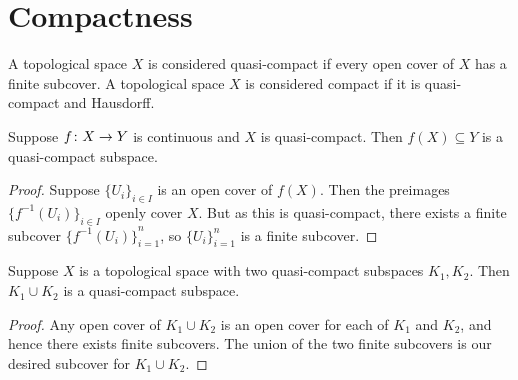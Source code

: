 \section{Compactness}

\begin{definition}
    A topological space \(X\) is considered quasi-compact
    if every open cover of \(X\) has a finite subcover.
    A topological space \(X\) is considered compact
    if it is quasi-compact and Hausdorff.
\end{definition}
\begin{proposition}\label{prop:continuous-image-compact}
    Suppose \(f\colon X\to Y\) is continuous and \(X\) is quasi-compact.
    Then \(f(X) \subseteq Y\) is a quasi-compact subspace.
\end{proposition}
\begin{proof}
    Suppose \({\{U_i\}}_{i \in I}\) is an open cover of \(f(X)\).
    Then the preimages \({\{f^{-1}(U_i)\}}_{i \in I}\) openly cover \(X\).
    But as this is quasi-compact, there exists a finite subcover \({\{f^{-1}(U_i)\}}_{i=1}^n\),
    so \({\{U_i\}}_{i=1}^n\) is a finite subcover.
\end{proof}
\begin{proposition}
    Suppose \(X\) is a topological space with two quasi-compact subspaces \(K_1,K_2\).
    Then \(K_1 \cup K_2\) is a quasi-compact subspace.
\end{proposition}
\begin{proof}
    Any open cover of \(K_1 \cup K_2\) is an open cover for each of \(K_1\) and \(K_2\),
    and hence there exists finite subcovers.
    The union of the two finite subcovers is our desired subcover for \(K_1 \cup K_2\).
\end{proof}

